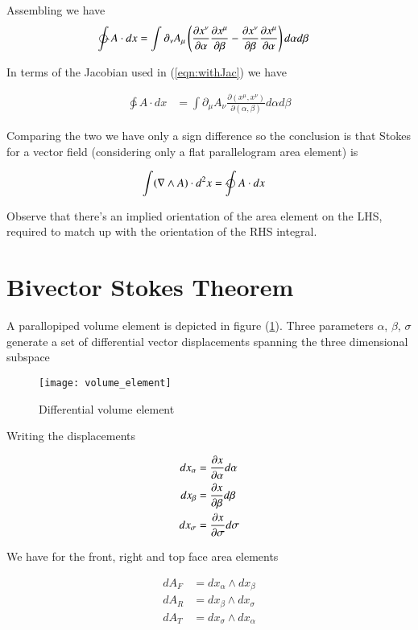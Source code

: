 Assembling we have
\begin{align*}
\ointctrclockwise 
A \cdot dx
&=
\int
\partial_\nu A_\mu \left( \PD{\alpha}{x^\nu} \PD{\beta}{x^\mu} - \PD{\beta}{x^\nu} \PD{\alpha}{x^\mu} \right) d\alpha d\beta
\end{align*}

In terms of the Jacobian used in (\ref{eqn:withJac}) we have

\begin{align*}
\ointctrclockwise 
A \cdot dx &= \int \partial_\mu A_\nu \frac{\partial (x^\mu, x^\nu)}{\partial (\alpha, \beta)} d\alpha d\beta
\end{align*}

Comparing the two we have only a sign difference so the conclusion is that Stokes for a vector field (considering only a flat parallelogram area element) is

\begin{align}
\int ( \grad \wedge A ) \cdot d^2 x &= \ointclockwise A \cdot dx
\end{align}

Observe that there's an implied orientation of the area element on the LHS, required to match up with the orientation of the RHS integral.

\section{Bivector Stokes Theorem}

A parallopiped volume element is depicted in figure (\ref{fig:volume_element}).  Three parameters $\alpha$, $\beta$, $\sigma$ generate a set of differential vector displacements spanning the three dimensional subspace

\begin{figure}[htp]
\centering
\texttt{[image: volume\_element]}
\caption{Differential volume element}\label{fig:volume_element}
\end{figure}

Writing the displacements 

\begin{align*}
dx_\alpha &= \frac{\partial {x}}{\partial {\alpha}} d\alpha \\
dx_\beta &= \frac{\partial {x}}{\partial {\beta}} d\beta \\
dx_\sigma &= \frac{\partial {x}}{\partial {\sigma}} d\sigma
\end{align*}

We have for the front, right and top face area elements 

\begin{align*}
dA_F &= dx_\alpha \wedge dx_\beta \\
dA_R &= dx_\beta \wedge dx_\sigma \\
dA_T &= dx_\sigma \wedge dx_\alpha \\
\end{align*}

